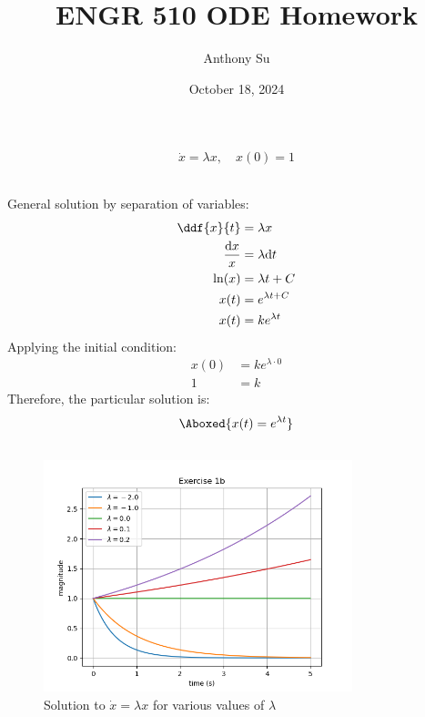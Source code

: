 \documentclass[11pt]{article}
\title{ENGR 510 ODE Homework}
\author{Anthony Su}
\date{October 18, 2024}
\begin{document}
\thispagestyle{plain}
\maketitle


\section{}
\begin{align*}
    \dot{x} = \lambda x, \quad x(0) = 1
\end{align*}


\subsection{}  %
General solution by separation of variables:
\begin{align*}
    \ddf{x}{t} &= \lambda x \\
    \frac{\text{d}x}{x} &= \lambda \text{d}t \\
    \ln(x) &= \lambda t + C \\
    x(t) &= e^{\lambda t + C} \\
    x(t) &= k e^{\lambda t}
\end{align*}
Applying the initial condition:
\begin{align*}
    x(0) &= k e^{\lambda \cdot 0} \\
    1 &= k
\end{align*}
Therefore, the particular solution is:
\begin{align*}
    \Aboxed{
    x(t) = e^{\lambda t}
    }
\end{align*}


\subsection{}  %
\begin{figure}[H]
    \centering
    \includegraphics[width=0.8\textwidth]{1b_fig1.png}
    \caption{Solution to $\dot{x}=\lambda x$ for various values of $\lambda$}
    \label{fig_1b1}
\end{figure}
\end{document}
